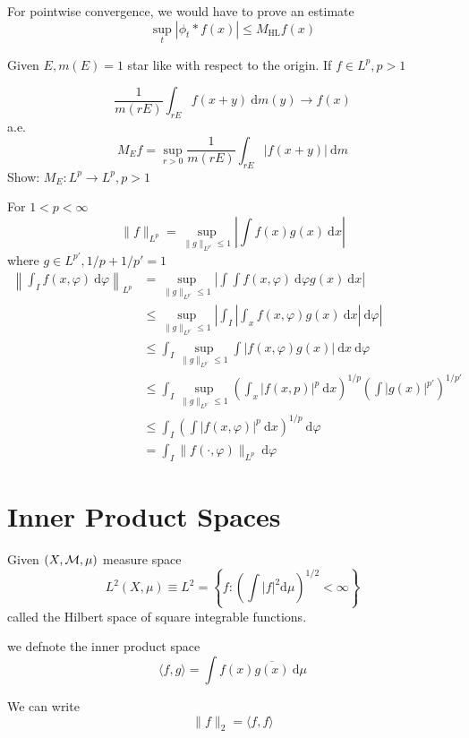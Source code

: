 For pointwise convergence, we would have to prove an estimate 
\[\sup_t |\phi_t * f(x)|\le M_{\mathrm{HL}}f(x)\]

Given $E, m(E) = 1$ star like with respect to the origin.
If $f \in L^p, p > 1$

\[\frac{1}{m(rE)}\int_{rE} f(x+y) \ \mathrm{d}m(y) \to f(x)\] a.e. 
\[M_Ef = \sup_{r > 0} \frac1{m(rE)} \int_{rE} |f(x+y)| \ \mathrm{d}m\]
Show: $M_E: L^p \to L^p, p > 1$


For $1 < p < \infty$
\[\|f\|_{L^p} = \sup_{\|g\|_{L^{p'}} \le 1} \left|\int f(x)g(x) \ \mathrm{d}x\right|\]
where $g \in L^{p'}, 1/p + 1/p' = 1$
\begin{align*}
  \left\|\int_{I} f(x, \varphi) \ \mathrm{d}\varphi\right\|_{L^p} &= \sup_{\|g\|_{L^{p'}} \le 1} \left|\int \int f(x, \varphi) \ \mathrm{d}\varphi g(x)\ \mathrm{d}x\right| \\
  &\le \sup_{\|g\|_{L^{p'}} \le 1}\left| \int_I \left|\int_x f(x, \varphi)g(x) \ \mathrm{d}x\right| \ \mathrm{d}\varphi \right|\\
  &\le \int_I \sup_{\|g\|_{L^{p'}} \le 1} \int |f(x, \varphi)g(x)| \ \mathrm{d}x\ \mathrm{d}\varphi \\
  &\le \int_I \sup_{\|g\|_{L^{p'}} \le 1} \left(\int_x |f(x, p)|^p \ \mathrm{d}x\right)^{1/p} \left(\int |g(x)|^{p'}\right)^{1/p'} \\
  &\le \int_I \left(\int |f(x, \varphi)|^p \ \mathrm{d}x\right)^{1/p} \ \mathrm{d}\varphi \\
  &= \int_I \|f(\cdot, \varphi)\|_{L^p} \ \mathrm{d}\varphi
\end{align*}
\section{Inner Product Spaces}


\begin{definition}
  Given $(X, \mathcal M, \mu)$ measure space
  \[L^2(X, \mu) \equiv L^2 =\left\{f : \left(\int |f|^2 \mathrm{d}\mu\right)^{1/2} < \infty\right\}\]
  called the Hilbert space of square integrable functions.
\end{definition}

\begin{definition}
  we defnote the inner product space
  \[\langle f, g\rangle  = \int f(x) \overline{g(x)} \ \mathrm{d}\mu\]
\end{definition}
\begin{remark}
  We can write
  \[\|f\|_2 = \langle f, f\rangle\]
\end{remark}

